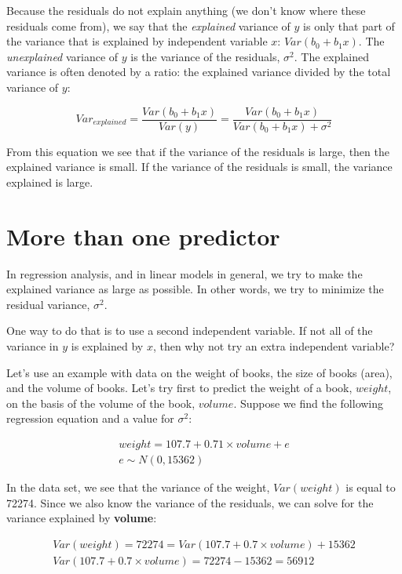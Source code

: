 \documentclass[]{report}\usepackage[]{graphicx}\usepackage[]{color}
\begin{document}
Because the residuals do not explain anything (we don't know where these residuals come from), we say that the \textit{explained} variance of $y$ is only that part of the variance that is explained by independent variable $x$: $Var(b_0 + b_1 x)$. The \textit{unexplained} variance of $y$ is the variance of the residuals, $\sigma^2$. The explained variance is often denoted by a ratio: the explained variance divided by the total variance of $y$:


\begin{equation}
Var_{explained} = \frac{Var(b_0+b_1 x)}{Var(y)} = \frac{Var(b_0+b_1 x)}{Var(b_0+b_1 x) + \sigma^2}
\end{equation}

From this equation we see that if the variance of the residuals is large, then the explained variance is small. If the variance of the residuals is small, the variance explained is large.


\section{More than one predictor}

In regression analysis, and in linear models in general, we try to make the explained variance as large as possible. In other words, we try to minimize the residual variance, $\sigma^2$.

One way to do that is to use a second independent variable. If not all of the variance in $y$ is explained by $x$, then why not try an extra independent variable?


Let's use an example with data on the weight of books, the size of books (area), and the volume of books. Let's try first to predict the weight of a book, $weight$, on the basis of the volume of the book, $volume$. Suppose we find the following regression equation and a value for $\sigma^2$:






\begin{eqnarray}
weight = 107.7 + 0.71 \times  volume + e \\
e \sim N(0, 15362)
\end{eqnarray}


In the data set, we see that the variance of the weight, $Var(weight)$ is equal to 72274. Since we also know the variance of the residuals, we can solve for the variance explained by \textbf{volume}:


\begin{eqnarray}
Var(weight) =  72274=   Var(107.7 + 0.7 \times  volume) + 15362 \nonumber\\
Var(107.7 + 0.7 \times  volume) = 72274- 15362= 56912\nonumber
\end{eqnarray}
\end{document}
